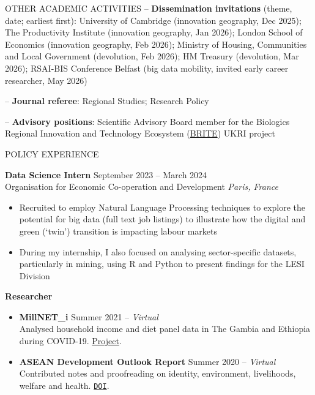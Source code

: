 \documentclass{resume}
\begin{document}
\begin{rSection}{OTHER ACADEMIC ACTIVITIES}
-- \textbf{Dissemination invitations} (theme, date; earliest first): University of Cambridge (innovation geography, Dec 2025); The Productivity Institute (innovation geography, Jan 2026); London School of Economics (innovation geography, Feb 2026); Ministry of Housing, Communities and Local Government (devolution, Feb 2026); HM Treasury (devolution, Mar 2026); RSAI-BIS Conference Belfast (big data mobility, invited early career researcher, May 2026)

-- \textbf{Journal referee}: Regional Studies; Research Policy

-- \textbf{Advisory positions}: Scientific Advisory Board member for the Biologics Regional Innovation and Technology Ecosystem (\href{https://briteprogramme.co.uk/}{BRITE}) UKRI project 

\end{rSection}

\begin{rSection}{POLICY EXPERIENCE}

\textbf{Data Science Intern} \hfill September 2023 -- March 2024 \\
Organisation for Economic Co-operation and Development \hfill \textit{Paris, France}
\vspace{-0.5em}
 \begin{itemize}
    \itemsep -3pt {} 
     \item Recruited to employ Natural Language Processing techniques to explore the potential for big data (full text job listings) to illustrate how the digital and green (`twin') transition is impacting labour markets
      \item During my internship, I also focused on analysing sector-specific datasets, particularly in mining, using R and Python to present findings for the LESI Division
 \end{itemize}

\textbf{Researcher} \hfill \\
\vspace{-1.75em}
 \begin{itemize}
    \itemsep -3pt {} 
     \item \textbf{MillNET\_i} \hfill Summer 2021 -- \textit{Virtual}\\
     Analysed household income and diet panel data in The Gambia and Ethiopia during COVID-19. \href{https://www.globalfood.cam.ac.uk/keyprogs/millneti}{Project}.
     \item \textbf{ASEAN Development Outlook Report} \hfill Summer 2020 -- \textit{Virtual}\\
     Contributed notes and proofreading on identity, environment, livelihoods, welfare and health. \href{https://www.asean.org/wp-content/uploads/2021/07/ASEAN-Development-Outlook-ADO_FINAL.pdf}{\nolinkurl{DOI}}.
 \end{itemize}
\end{rSection}
\end{document}
